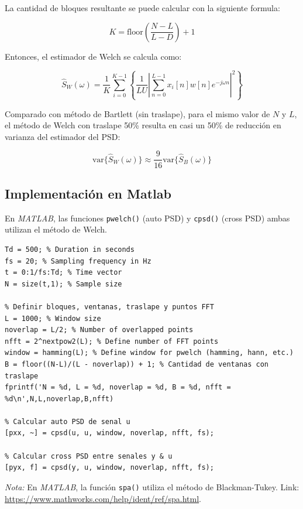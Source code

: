 La cantidad de bloques resultante se puede calcular con la siguiente formula:

$$K = \text{floor}\left(\frac{N-L}{L - D}\right) + 1$$

Entonces, el estimador de Welch se calcula como:

$$\hat{S}_W (\omega) =\frac{1}{K}\sum_{i=0}^{K-1} \left\{ \frac{1}{LU}\left| \sum_{n=0}^{L-1} x_i[n]w[n]e^{-j\omega n} \right|^2 \right\}$$



Comparado con método de Bartlett (sin traslape), para el mismo valor de $N$ y $L$, el método de Welch con traslape 50\% resulta en casi un 50\% de reducción en varianza del estimador del PSD:

  $$\text{var}\{\hat{S}_W (\omega)\} \approx \frac{9}{16} \text{var}\{\hat{S}_B (\omega)\} $$


\subsection{Implementación en Matlab}

En \emph{MATLAB}, las funciones \texttt{pwelch()} (auto PSD) y \texttt{cpsd()} (cross PSD) ambas utilizan el método de Welch.

\begin{lstlisting}[style=matlab-editor]
% Muestras de senal digital
Td = 500; % Duration in seconds
fs = 20; % Sampling frequency in Hz
t = 0:1/fs:Td; % Time vector
N = size(t,1); % Sample size

% Definir bloques, ventanas, traslape y puntos FFT
L = 1000; % Window size
noverlap = L/2; % Number of overlapped points
nfft = 2^nextpow2(L); % Define number of FFT points
window = hamming(L); % Define window for pwelch (hamming, hann, etc.)
B = floor((N-L)/(L - noverlap)) + 1; % Cantidad de ventanas con traslape
fprintf('N = %d, L = %d, noverlap = %d, B = %d, nfft = %d\n',N,L,noverlap,B,nfft)

% Calcular auto PSD de senal u
[pxx, ~] = cpsd(u, u, window, noverlap, nfft, fs);

% Calcular cross PSD entre senales y & u
[pyx, f] = cpsd(y, u, window, noverlap, nfft, fs);
\end{lstlisting}


\noindent \emph{Nota:} En \emph{MATLAB}, la función \texttt{spa()} utiliza el método de Blackman-Tukey. Link: \url{https://www.mathworks.com/help/ident/ref/spa.html}.

